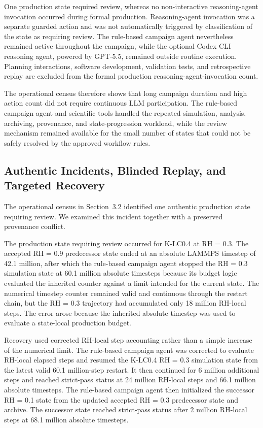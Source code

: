 One production state required review, whereas no non-interactive reasoning-agent invocation occurred during formal production. Reasoning-agent invocation was a separate guarded action and was not automatically triggered by classification of the state as requiring review. The rule-based campaign agent nevertheless remained active throughout the campaign, while the optional Codex CLI reasoning agent, powered by GPT-5.5, remained outside routine execution. Planning interactions, software development, validation tests, and retrospective replay are excluded from the formal production reasoning-agent-invocation count.

The operational census therefore shows that long campaign duration and high action count did not require continuous LLM participation. The rule-based campaign agent and scientific tools handled the repeated simulation, analysis, archiving, provenance, and state-progression workload, while the review mechanism remained available for the small number of states that could not be safely resolved by the approved workflow rules.

\FloatBarrier

\subsection{Authentic Incidents, Blinded Replay, and Targeted Recovery}

The operational census in Section~3.2 identified one authentic production state requiring review. We examined this incident together with a preserved provenance conflict.

The production state requiring review occurred for K-LC0.4 at RH = 0.3. The accepted RH = 0.9 predecessor state ended at an absolute LAMMPS timestep of 42.1 million, after which the rule-based campaign agent stopped the RH = 0.3 simulation state at 60.1 million absolute timesteps because its budget logic evaluated the inherited counter against a limit intended for the current state. The numerical timestep counter remained valid and continuous through the restart chain, but the RH = 0.3 trajectory had accumulated only 18 million RH-local steps. The error arose because the inherited absolute timestep was used to evaluate a state-local production budget.

Recovery used corrected RH-local step accounting rather than a simple increase of the numerical limit. The rule-based campaign agent was corrected to evaluate RH-local elapsed steps and resumed the K-LC0.4 RH = 0.3 simulation state from the latest valid 60.1 million-step restart. It then continued for 6 million additional steps and reached strict-pass status at 24 million RH-local steps and 66.1 million absolute timesteps. The rule-based campaign agent then initialized the successor RH = 0.1 state from the updated accepted RH = 0.3 predecessor state and archive. The successor state reached strict-pass status after 2 million RH-local steps at 68.1 million absolute timesteps.


